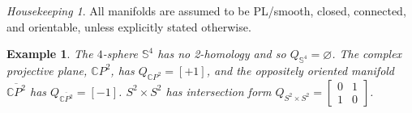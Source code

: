 \documentclass[pdflatex,sn-mathphys-num]{sn-jnl}
\theoremstyle{thmstyleone}%
\theoremstyle{thmstyletwo}%
\newtheorem{example}{Example}%
\theoremstyle{thmstylethree}%
\newcommand{\cpp}{\mathbb{C}P^2}
\theoremstyle{remark}
\newtheorem{housekeeping}{Housekeeping}
\begin{document}
\begin{housekeeping}
All manifolds are assumed to be PL/smooth, closed, connected, and orientable, unless explicitly stated otherwise.
\end{housekeeping}

\begin{example}
    The $4$-sphere $\mathbb{S}^4$ has no 2-homology and so $Q_{\mathbb{S}^4}=\varnothing$. The complex projective plane, $\cpp$, has $Q_{\cpp}=[+1]$, and the oppositely oriented manifold $\overline{\cpp}$ has $Q_{\overline{\cpp}}=[-1]$. $S^2\times S^2$ has intersection form $Q_{S^2\times S^2}=\begin{bmatrix} 0 & 1 \\ 1 & 0 \end{bmatrix}$. 
\end{example}
\end{document}
